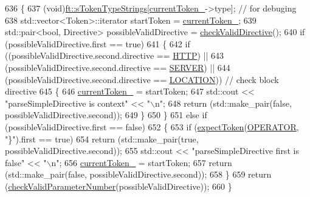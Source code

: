 \begin{DoxyCode}
636     \{
637         (void)\hyperlink{namespaceft_a1b9b00bc284da71346729142b8560e03}{ft::sTokenTypeStrings}[\hyperlink{classft_1_1_parser_a942c5b794d108f144c5b5028aaa34cb6}{currentToken\_}->type]; \textcolor{comment}{// for debuging}
638         std::vector<Token>::iterator startToken = \hyperlink{classft_1_1_parser_a942c5b794d108f144c5b5028aaa34cb6}{currentToken\_};
639         std::pair<bool, Directive> possibleValidDirective = \hyperlink{classft_1_1_parser_ad48298d21629daf7c9a31e101bf322ba}{checkValidDirective}();
640         \textcolor{keywordflow}{if} (possibleValidDirective.first == \textcolor{keyword}{true})
641         \{
642             \textcolor{keywordflow}{if} ((possibleValidDirective.second.directive == \hyperlink{namespaceft_a5a5554dff10f0dc50bae4cc5825ad75da67e044074f46e6cea22788527da5f02e}{HTTP}) ||
643                     (possibleValidDirective.second.directive == \hyperlink{namespaceft_a5a5554dff10f0dc50bae4cc5825ad75da67c96b24b23bcb408bae7626730a04b7}{SERVER}) ||
644                     (possibleValidDirective.second.directive == \hyperlink{namespaceft_a5a5554dff10f0dc50bae4cc5825ad75da1e9e3944b93fde52c7c92e1e15dcaf4a}{LOCATION})) \textcolor{comment}{// check block directive}
645             \{
646                 \hyperlink{classft_1_1_parser_a942c5b794d108f144c5b5028aaa34cb6}{currentToken\_} = startToken;
647                 std::cout << \textcolor{stringliteral}{"parseSimpleDirective is context"} << \textcolor{stringliteral}{"\(\backslash\)n"};
648                 \textcolor{keywordflow}{return} (std::make\_pair(\textcolor{keyword}{false}, possibleValidDirective.second));
649             \}
650         \}
651         \textcolor{keywordflow}{else} \textcolor{keywordflow}{if} (possibleValidDirective.first == \textcolor{keyword}{false})
652         \{
653             \textcolor{keywordflow}{if} (\hyperlink{classft_1_1_parser_a1615a752d3642bb53598e2c8db810db0}{expectToken}(\hyperlink{namespaceft_aa520fbf142ba1e7e659590c07da31921a6411d9d6073252e4d316493506bbb979}{OPERATOR}, \textcolor{stringliteral}{"\}"}).first == \textcolor{keyword}{true})
654                 \textcolor{keywordflow}{return} (std::make\_pair(\textcolor{keyword}{true}, possibleValidDirective.second));
655             std::cout << \textcolor{stringliteral}{"parseSimpleDirective first is false"} << \textcolor{stringliteral}{"\(\backslash\)n"};
656             \hyperlink{classft_1_1_parser_a942c5b794d108f144c5b5028aaa34cb6}{currentToken\_} = startToken;
657             \textcolor{keywordflow}{return} (std::make\_pair(\textcolor{keyword}{false}, possibleValidDirective.second));
658         \}
659         \textcolor{keywordflow}{return} (\hyperlink{classft_1_1_parser_a31501116433b0b1f8d9d58f27658ea98}{checkValidParameterNumber}(possibleValidDirective));
660     \}
\end{DoxyCode}
